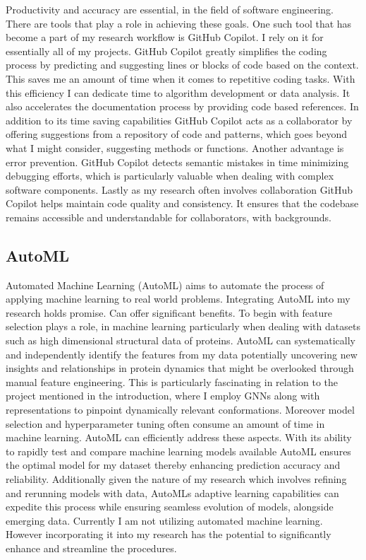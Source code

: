 \documentclass[11pt,a4paper]{article}
\begin{document}
Productivity and accuracy are essential, in the field of software engineering. There are tools that play a role in achieving these goals. One such tool that has become a part of my research workflow is GitHub Copilot. I rely on it for essentially all of my projects.
GitHub Copilot greatly simplifies the coding process by predicting and suggesting lines or blocks of code based on the context. This saves me an amount of time when it comes to repetitive coding tasks. With this efficiency I can dedicate time to algorithm development or data analysis. It also accelerates the documentation process by providing code based references.
In addition to its time saving capabilities GitHub Copilot acts as a collaborator by offering suggestions from a repository of code and patterns, which goes beyond what I might consider, suggesting methods or functions.
Another advantage is error prevention. GitHub Copilot detects semantic mistakes in time minimizing debugging efforts, which is particularly valuable when dealing with complex software components.
Lastly as my research often involves collaboration GitHub Copilot helps maintain code quality and consistency. It ensures that the codebase remains accessible and understandable for collaborators, with backgrounds.


\subsection{AutoML}

Automated Machine Learning (AutoML) aims to automate the process of applying machine learning to real world problems. Integrating AutoML into my research holds promise. Can offer significant benefits.
To begin with feature selection plays a role, in machine learning particularly when dealing with datasets such as high dimensional structural data of proteins. AutoML can systematically and independently identify the features from my data potentially uncovering new insights and relationships in protein dynamics that might be overlooked through manual feature engineering. This is particularly fascinating in relation to the project mentioned in the introduction, where I employ GNNs along with representations to pinpoint dynamically relevant conformations.
Moreover model selection and hyperparameter tuning often consume an amount of time in machine learning. AutoML can efficiently address these aspects. With its ability to rapidly test and compare machine learning models available AutoML ensures the optimal model for my dataset thereby enhancing prediction accuracy and reliability.
Additionally given the nature of my research which involves refining and rerunning models with data, AutoMLs adaptive learning capabilities can expedite this process while ensuring seamless evolution of models, alongside emerging data.
Currently I am not utilizing automated machine learning. However incorporating it into my research has the potential to significantly enhance and streamline the procedures.
\end{document}
